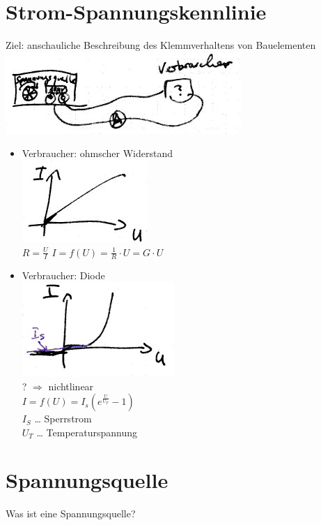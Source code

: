 \section{Strom-Spannungskennlinie}
Ziel: anschauliche Beschreibung des Klemmverhaltens von Bauelementen\\
\includegraphics[scale=1.5]{Abbildungen/ABB304}
\begin{itemize}
\item Verbraucher: ohmscher Widerstand\\
\includegraphics[scale=1.5]{Abbildungen/ABB305}\\
$R=\frac{U}{I}$
$I=f(U)=\frac{1}{R}\cdot U = G \cdot U$
\item Verbraucher: Diode\\
\includegraphics[scale=1.5]{Abbildungen/ABB306}\\
? $\Rightarrow$ nichtlinear\\
$I=f(U)=I_s\left(e^{\frac{U}{U_T}}-1\right)$\\
$I_S$ … Sperrstrom\\
$U_T$ … Temperaturspannung 
\end{itemize}

\section{Spannungsquelle}

Was ist eine Spannungsquelle?

